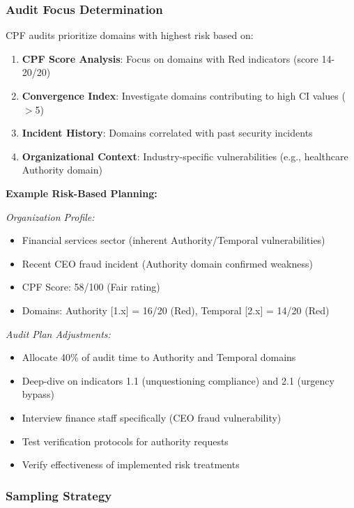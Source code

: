 \documentclass[11pt,a4paper]{article}
\begin{document}
\subsubsection{Audit Focus Determination}

CPF audits prioritize domains with highest risk based on:

\begin{enumerate}
\item \textbf{CPF Score Analysis}: Focus on domains with Red indicators (score 14-20/20)
\item \textbf{Convergence Index}: Investigate domains contributing to high CI values ($>$5)
\item \textbf{Incident History}: Domains correlated with past security incidents
\item \textbf{Organizational Context}: Industry-specific vulnerabilities (e.g., healthcare Authority domain)
\end{enumerate}

\textbf{Example Risk-Based Planning:}

\textit{Organization Profile:}
\begin{itemize}
\item Financial services sector (inherent Authority/Temporal vulnerabilities)
\item Recent CEO fraud incident (Authority domain confirmed weakness)
\item CPF Score: 58/100 (Fair rating)
\item Domains: Authority [1.x] = 16/20 (Red), Temporal [2.x] = 14/20 (Red)
\end{itemize}

\textit{Audit Plan Adjustments:}
\begin{itemize}
\item Allocate 40\% of audit time to Authority and Temporal domains
\item Deep-dive on indicators 1.1 (unquestioning compliance) and 2.1 (urgency bypass)
\item Interview finance staff specifically (CEO fraud vulnerability)
\item Test verification protocols for authority requests
\item Verify effectiveness of implemented risk treatments
\end{itemize}

\subsubsection{Sampling Strategy}
\end{document}

